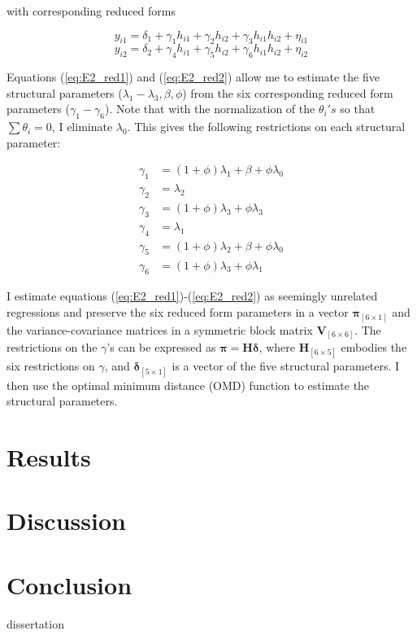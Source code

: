 \documentclass[11pt]{article}
\begin{document}
with corresponding reduced forms

\begin{equation} \label{eq:E2_red1}
    y_{i1} = \delta_1 + \gamma_{1}h_{i1} + \gamma_{2}h_{i2} + \gamma_{3}h_{i1}h_{i2} + \eta_{i1}
\end{equation}
\begin{equation} \label{eq:E2_red2}
    y_{i2} = \delta_2 + \gamma_{4}h_{i1} + \gamma_{5}h_{i2} + \gamma_{6}h_{i1}h_{i2} + \eta_{i2}
\end{equation}

Equations (\ref{eq:E2_red1}) and (\ref{eq:E2_red2}) allow me to estimate the five structural parameters ($\lambda_1-\lambda_3,\beta,\phi$) from the six corresponding reduced form parameters ($\gamma_{1}-\gamma_{6}$). Note that with the normalization of the $\theta_{i}'s$ so that $\sum \theta_{i} = 0$, I eliminate $\lambda_0$. This gives the following restrictions on each structural parameter:

\begin{align*}
    \gamma_1 & = (1+\phi)\lambda_1 + \beta + \phi\lambda_0 \\
    \gamma_2 & = \lambda_2 \\
    \gamma_3 & = (1+\phi)\lambda_3 + \phi\lambda_3 \\
    \gamma_4 & = \lambda_1 \\
    \gamma_5 & = (1+\phi)\lambda_2 + \beta + \phi\lambda_0 \\
    \gamma_6 & = (1+\phi)\lambda_3 + \phi\lambda_1
\end{align*}

I estimate equations (\ref{eq:E2_red1})-(\ref{eq:E2_red2}) as seemingly unrelated regressions and preserve the six reduced form parameters in a vector $\boldsymbol{\pi}_{[6 \times 1]}$ and the variance-covariance matrices in a symmetric block matrix $\textbf{V}_{[6 \times 6]}$. The restrictions on the $\gamma$’s can be expressed as $\boldsymbol{\pi} = \textbf{H}\boldsymbol{\delta}$, where $\textbf{H}_{[6 \times 5]}$ embodies the six restrictions on $\gamma$, and $\boldsymbol{\delta}_{[5 \times 1]}$ is a vector of the five structural parameters. I then use the optimal minimum distance (OMD) function to estimate the structural parameters.%

\section{Results}

\section{Discussion}

\section{Conclusion}

\newpage
 {dissertation}
\end{document}
